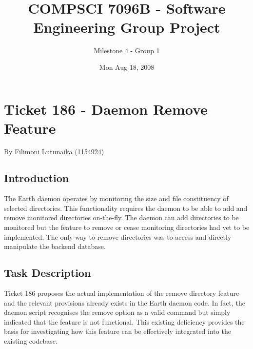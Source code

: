 \documentclass[10pt,a4,oneside]{article}
\begin{document}
\title{COMPSCI 7096B - Software Engineering Group Project}
\author{Milestone 4 - Group 1}
\date{Mon Aug 18, 2008}

\maketitle

\section*{Ticket 186 - Daemon Remove Feature}

\paragraph{} By Filimoni Lutunaika (1154924)

\paragraph{}


\subsection*{Introduction}

The Earth daemon operates by monitoring the size and file constituency of 
selected directories. This functionality requires the daemon to be able to 
add and remove monitored directories on-the-fly. The daemon can add 
directories to be monitored but the feature to remove or cease monitoring 
directories had yet to be implemented. The only way to remove directories 
was to access and directly manipulate the backend database.


\paragraph{}

\subsection*{Task Description}

Ticket 186 proposes the actual implementation of the remove directory 
feature and the relevant provisions already exists in the Earth daemon 
code. In fact, the daemon script recognises the remove option as a valid 
command but simply indicated that the feature is not functional. This 
existing deficiency provides the basis for investigating how this feature 
can be effectively integrated into the existing codebase.
\end{document}
